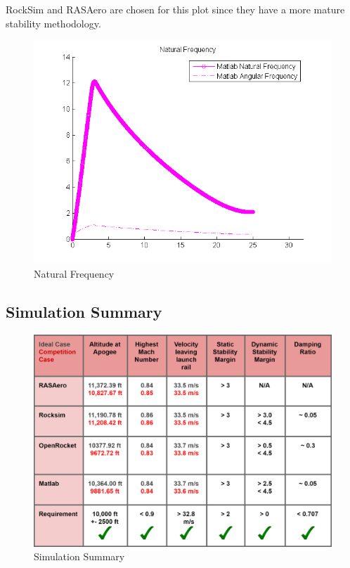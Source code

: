 \documentclass[]{article}
\begin{document}
RockSim and RASAero are chosen for this plot since they have a more
mature stability methodology.

\begin{figure}[htbp]
\centering
\includegraphics{images/plots/plot_natural_frequency.png}
\caption{Natural Frequency \label{plot_natural_frequency}}
\end{figure}

\clearpage

\subsection{Simulation Summary}\label{simulation-summary}

\begin{figure}[htbp]
\centering
\includegraphics{images/simulation_summary.png}
\caption{Simulation Summary \label{plt_simulation_summary}}
\end{figure}
\end{document}
